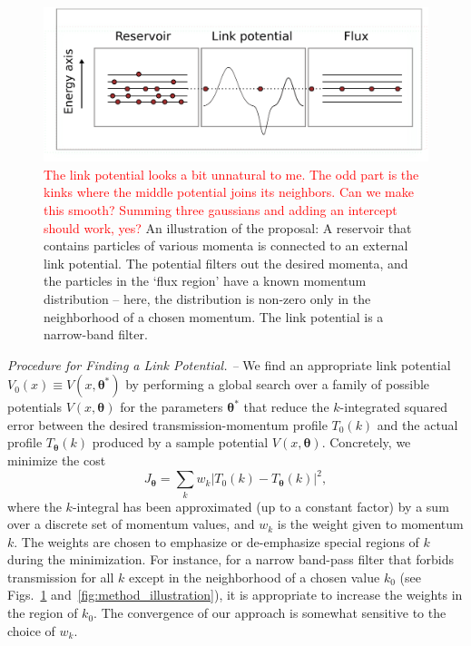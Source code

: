 \documentclass[twocolumn,amsmath,amssymb,showpacs,prl,superscriptaddress,aps]{revtex4-1}
\begin{document}
\begin{figure}
\centerline{\includegraphics[scale=0.3]{figure1new.pdf}}
\caption{ \textcolor{red}{The link potential looks a bit unnatural to me. The odd part is the kinks where the middle potential joins its neighbors. Can we make this smooth? Summing three gaussians and adding an intercept should work, yes?} An illustration of the proposal: A reservoir that contains particles of various momenta is connected to an external link potential. The potential filters out the desired momenta, and the particles in the `flux region' have a known momentum distribution -- here, the distribution is non-zero only in the neighborhood of a chosen momentum. The link potential is a narrow-band filter.
}
\label{fig:Figure1}
\end{figure}

{\it Procedure for Finding a Link Potential. --} 
We find an appropriate link potential $V_0(x) \equiv V(x,\bm{\theta}^*)$ by performing a global search over a family of possible potentials $V(x,\bm{\theta})$ for the parameters $\bm{\theta}^*$ that reduce the $k$-integrated squared error between the desired transmission-momentum profile $T_0(k)$ and the actual profile $T_{\bm\theta}(k)$ produced by a sample potential $V(x, \bm{\theta})$. Concretely, we minimize the cost
\begin{equation}\label{eq:cost1}
  J_{\bm{\theta}} = \sum_kw_k\left|T_0(k) - T_{\bm{\theta}}(k)\right|^2,
\end{equation}
where the $k$-integral has been approximated (up to a constant factor) by a sum over a discrete set of momentum values, and $w_k$ is the weight given to momentum $k$. The weights are chosen to emphasize or de-emphasize special regions of $k$ during the minimization. For instance, for a narrow band-pass filter that forbids transmission for all $k$ except in the neighborhood of a chosen value $k_0$ (see Figs.~\ref{fig:Figure1} and~\ref{fig:method_illustration}), it is appropriate to increase the weights in the region of $k_0$. The convergence of our approach is somewhat sensitive to the choice of $w_k$.
\end{document}
